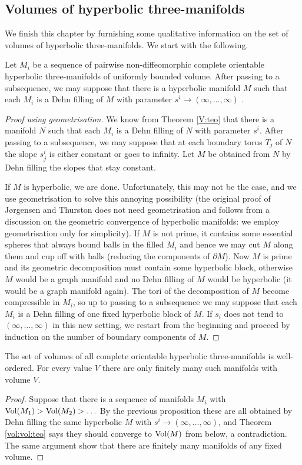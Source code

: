\subsection{Volumes of hyperbolic three-manifolds}
We finish this chapter by furnishing some qualitative information on the set of volumes of hyperbolic three-manifolds. We start with the following.

\begin{prop}
Let $M_i$ be a sequence of pairwise non-diffeomorphic complete orientable hyperbolic three-manifolds of uniformly bounded volume. After passing to a subsequence, we may suppose that there is a hyperbolic manifold $M$ such that each $M_i$ is a Dehn filling of $M$ with parameter $s^i\to (\infty, \ldots, \infty)$ . 
\end{prop}
\begin{proof}[Proof using geometrisation]
We know from Theorem \ref{V:teo} that there is a manifold $N$ such that each $M_i$ is a Dehn filling of $N$ with parameter $s^i$. After passing to a subsequence, we may suppose that at each boundary torus $T_j$ of $N$ the slope $s^i_j$ is either constant or goes to infinity. Let $M$ be obtained from $N$ by Dehn filling the slopes that stay constant.

If $M$ is hyperbolic, we are done. Unfortunately, this may not be the case, and we use geometrisation to solve this annoying possibility (the original proof of J\o rgensen and Thurston \cite{Th} does not need geometrisation and follows from a discussion on the geometric convergence of hyperbolic manifolds: we employ geometrisation only for simplicity). If $M$ is not prime, it contains some essential spheres that always bound balls in the filled $M_i$ and hence we may cut $M$ along them and cup off with balls (reducing the components of $\partial M$). Now $M$ is prime and its geometric decomposition must contain some hyperbolic block, otherwise $M$ would be a graph manifold and no Dehn filling of $M$ would be hyperbolic (it would be a graph manifold again). The tori of the decomposition of $M$ become compressible in $M_i$, so up to passing to a subsequence we may suppose that each $M_i$ is a Dehn filling of one fixed hyperbolic block of $M$. If $s_i$ does not tend to $(\infty, \ldots, \infty)$ in this new setting, we restart from the beginning and proceed by induction on the number of boundary components of $M$.
\end{proof}

\begin{cor}
The set of volumes of all complete orientable hyperbolic three-manifolds is well-ordered. For every value $V$ there are only finitely many such manifolds with volume $V$.
\end{cor}
\begin{proof}
Suppose that there is a sequence of manifolds $M_i$ with ${\rm Vol}(M_1) > {\rm Vol} (M_2) > \ldots $ By the previous proposition these are all obtained by Dehn filling the same hyperbolic $M$ with $s^i \to (\infty,\ldots,\infty)$, and Theorem \ref{vol:vol:teo} says they should converge to ${\rm Vol}(M)$ from below, a contradiction. The same argument show that there are finitely many manifolds of any fixed volume.
\end{proof}

